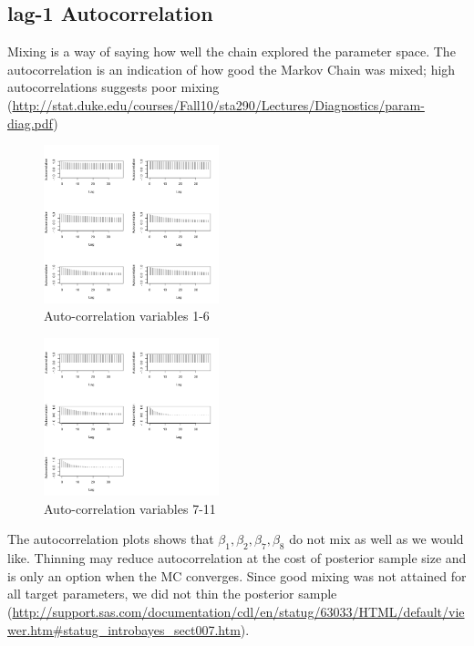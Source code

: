 \documentclass[11pt]{amsart}
\begin{document}
\subsection*{lag-1 Autocorrelation}
Mixing is a way of saying how well the chain explored the parameter space. The autocorrelation is an indication of how good the Markov Chain was mixed; high autocorrelations suggests poor mixing (\url{http://stat.duke.edu/courses/Fall10/sta290/Lectures/Diagnostics/param-diag.pdf})

 \begin{figure}[htbp] %
   \centering
   \includegraphics[width=2in]{BayesLogit/real_auto_cor_1_6.png} 
   \caption{Auto-correlation variables 1-6}
\end{figure}


 \begin{figure}[htbp] %
   \centering
   \includegraphics[width=2in]{BayesLogit/real_auto_cor_7_11.png} 
   \caption{Auto-correlation variables 7-11}
\end{figure}


The autocorrelation plots shows that $\beta_1,\beta_2,  \beta_7, \beta_8$ do not mix as well as we would like.  Thinning may reduce autocorrelation at the cost of posterior sample size and is only an option when the MC converges. Since good  mixing was not attained for all target parameters, we did not thin the posterior sample (\url{http://support.sas.com/documentation/cdl/en/statug/63033/HTML/default/viewer.htm#statug_introbayes_sect007.htm}). 
\end{document}
